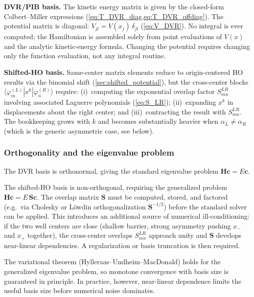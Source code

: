 \textbf{DVR/PIB basis.}
The kinetic energy matrix is given by the closed-form Colbert--Miller expressions
(\cref{eq:T_DVR_diag,eq:T_DVR_offdiag}).  The potential matrix is diagonal:
$V_{jl} = V(x_j)\,\delta_{jl}$ (\cref{eq:V_DVR}).  No integral is ever computed;
the Hamiltonian is assembled solely from point evaluations of $V(x)$ and the analytic
kinetic-energy formula.  Changing the potential requires changing only the function
evaluation, not any integral routine.

\textbf{Shifted-HO basis.}
Same-center matrix elements reduce to origin-centered HO results via the binomial shift
(\cref{sec:shifted_potential}), but the cross-center blocks $\langle\varphi_m^{(L)}|x^k|
\varphi_n^{(R)}\rangle$ require: (i)~computing the exponential overlap factor
$S_{mn}^{LR}$ involving associated Laguerre polynomials (\cref{eq:S_LR}); (ii)~expanding
$x^k$ in displacements about the right center; and (iii)~contracting the result with
$S_{mn}^{LR}$.  The bookkeeping grows with $k$ and becomes substantially heavier when
$\alpha_L \neq \alpha_R$ (which is the generic asymmetric case, see below).

\subsubsection{Orthogonality and the eigenvalue problem}

The DVR basis is orthonormal, giving the standard eigenvalue problem $\mathbf{H}\mathbf{c}
= E\mathbf{c}$.

The shifted-HO basis is non-orthogonal, requiring the generalized problem
$\mathbf{H}\mathbf{c} = E\,\mathbf{S}\mathbf{c}$.  The overlap matrix $\mathbf{S}$ must
be computed, stored, and factored (e.g.\ via Cholesky or L\"owdin orthogonalization
$\mathbf{S}^{-1/2}$) before the standard solver can be applied.  This introduces an
additional source of numerical ill-conditioning: if the two well centers are close (shallow
barrier, strong asymmetry pushing $x_-$ and $x_+$ together), the cross-center overlaps
$S_{mn}^{LR}$ approach unity and $\mathbf{S}$ develops near-linear dependencies.  A
regularization or basis truncation is then required.

\begin{remark}
  The variational theorem (Hylleraas--Undheim--MacDonald) holds for the generalized
  eigenvalue problem, so monotone convergence with basis size is guaranteed in principle.
  In practice, however, near-linear dependence limits the useful basis size before
  numerical noise dominates.
\end{remark}

